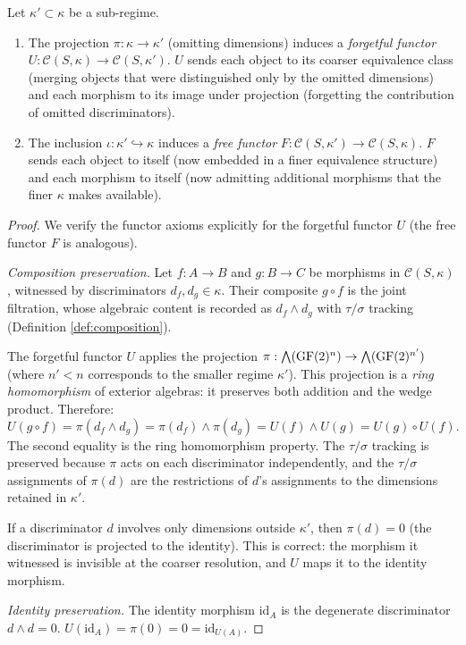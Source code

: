 \begin{proposition}\label{prop:forgetful}
Let $\kappa' \subset \kappa$ be a sub-regime.
\begin{enumerate}[label=(\roman*),nosep]
  \item The projection $\pi: \kappa \to \kappa'$ (omitting
    dimensions) induces a \emph{forgetful functor}
    $U: \mathcal{C}(S,\kappa) \to \mathcal{C}(S,\kappa')$.
    $U$ sends each object to its coarser equivalence class
    (merging objects that were distinguished only by the
    omitted dimensions) and each morphism to its image under
    projection (forgetting the contribution of omitted
    discriminators).
  \item The inclusion $\iota: \kappa' \hookrightarrow \kappa$
    induces a \emph{free functor}
    $F: \mathcal{C}(S,\kappa') \to \mathcal{C}(S,\kappa)$.
    $F$ sends each object to itself (now embedded in a
    finer equivalence structure) and each morphism to itself
    (now admitting additional morphisms that the finer
    $\kappa$ makes available).
\end{enumerate}
\end{proposition}

\begin{proof}
We verify the functor axioms explicitly for the forgetful
functor $U$ (the free functor $F$ is analogous).

\emph{Composition preservation.}
Let $f: A \to B$ and $g: B \to C$ be morphisms in
$\mathcal{C}(S,\kappa)$, witnessed by discriminators
$d_f, d_g \in \kappa$. Their composite $g \circ f$ is
the joint filtration, whose algebraic content is recorded
as $d_f \wedge d_g$ with $\tau/\sigma$ tracking
(Definition \ref{def:composition}).

The forgetful functor $U$ applies the projection
$\pi: \bigwedge(\operatorname{GF}(2)^n) \to \bigwedge(\operatorname{GF}(2)^{n'})$
(where $n' < n$ corresponds to the smaller regime
$\kappa'$). This projection is a \emph{ring homomorphism}
of exterior algebras: it preserves both addition and the
wedge product. Therefore:
\[
  U(g \circ f) = \pi(d_f \wedge d_g)
  = \pi(d_f) \wedge \pi(d_g)
  = U(f) \wedge U(g) = U(g) \circ U(f).
\]
The second equality is the ring homomorphism property.
The $\tau/\sigma$ tracking is preserved because $\pi$
acts on each discriminator independently, and the
$\tau/\sigma$ assignments of $\pi(d)$ are the restrictions
of $d$'s assignments to the dimensions retained in
$\kappa'$.

If a discriminator $d$ involves only dimensions outside
$\kappa'$, then $\pi(d) = 0$ (the discriminator is
projected to the identity). This is correct: the morphism
it witnessed is invisible at the coarser resolution,
and $U$ maps it to the identity morphism.

\emph{Identity preservation.}
The identity morphism $\mathrm{id}_A$ is the degenerate
discriminator $d \wedge d = 0$.
$U(\mathrm{id}_A) = \pi(0) = 0 = \mathrm{id}_{U(A)}$.
\end{proof}

